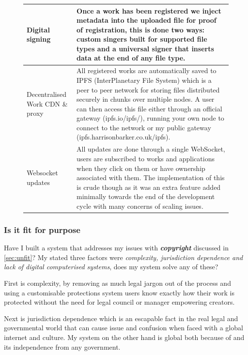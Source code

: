 \documentclass[12pt]{article}
\newcommand{\keyword}[1]{\textbf{\textit{#1}}}
\begin{document}
\begin{figure}[H]
\begin{table}[H]
\begin{tabular}{|p{}|p{}|}
Digital signing                 & Once a work has been registered we inject metadata into the uploaded file for proof of registration, this is done two ways: custom singers built for supported file types and a universal signer that inserts data at the end of any file type.                                                                                                                                     \\ \hline
Decentralised Work CDN \& proxy & All registered works are automatically saved to IPFS (InterPlanetary File System) which is a peer to peer network for storing files distributed securely in chunks over multiple nodes. A user can then access this file either through an official gateway (ipfs.io/ipfs/), running your own node to connect to the network or my public gateway (ipfs.harrisonbarker.co.uk/ipfs). \\ \hline
Websocket updates               & All updates are done through a single WebSocket, users are subscribed to works and applications when they click on them or have ownership associated with them.  The implementation of this is crude though as it was an extra feature added minimally towards the end of the development cycle with many concerns of scaling issues.                                               \\ \hline

\end{tabular}
\end{table}
\end{figure}

\subsubsection{Is it fit for purpose}


Have I built a system that addresses my issues with \keyword{copyright} discussed in \autoref{sec:unfit}? My stated three factors were \textit{complexity, jurisdiction dependence and lack of digital computerised systems}, does my system solve any of these?

First is complexity, by removing as much legal jargon out of the process and using a customisable protections system users know exactly how their work is protected without the need for legal council or manager empowering creators. 

Next is jurisdiction dependence which is an escapable fact in the real legal and governmental world that can cause issue and confusion when faced with a global internet and culture. My system on the other hand is global both because of  and its independence from any government.
\end{document}
